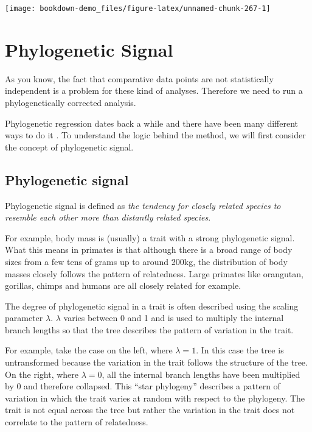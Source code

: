 \documentclass[
]{book}
\begin{document}
\begin{center}\texttt{[image: bookdown-demo\_files/figure-latex/unnamed-chunk-267-1]} \end{center}

\hypertarget{phylogenetic-signal}{%
\section{Phylogenetic Signal}\label{phylogenetic-signal}}

As you know, the fact that comparative data points are not statistically independent is a problem for these kind of analyses. Therefore we need to run a phylogenetically corrected analysis.

Phylogenetic regression dates back a while and there have been many different ways to do it \citep{Grafen89, Nunn11}. To understand the logic behind the method, we will first consider the concept of phylogenetic signal.

\hypertarget{phylogenetic-signal-1}{%
\subsection{Phylogenetic signal}\label{phylogenetic-signal-1}}

Phylogenetic signal is defined as \emph{the tendency for closely related species to resemble each other more than distantly related species}.

For example, body mass is (usually) a trait with a strong phylogenetic signal. What this means in primates is that although there is a broad range of body sizes from a few tens of grams up to around 200kg, the distribution of body masses closely follows the pattern of relatedness. Large primates like orangutan, gorillas, chimps and humans are all closely related for example.

The degree of phylogenetic signal in a trait is often described using the scaling parameter \(\lambda\). \(\lambda\) varies between 0 and 1 and is used to multiply the internal branch lengths so that the tree describes the pattern of variation in the trait.

For example, take the case on the left, where \(\lambda = 1\). In this case the tree is untransformed because the variation in the trait follows the structure of the tree. On the right, where \(\lambda = 0\), all the internal branch lengths have been multiplied by 0 and therefore collapsed. This ``star phylogeny'' describes a pattern of variation in which the trait varies at random with respect to the phylogeny. The trait is not equal across the tree but rather the variation in the trait does not correlate to the pattern of relatedness.
\end{document}
